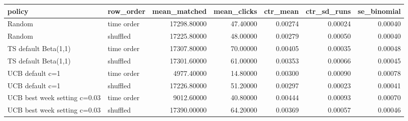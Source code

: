 \begin{tabular}{llrrrrr}
\toprule
policy & row\_order & mean\_matched & mean\_clicks & ctr\_mean & ctr\_sd\_runs & se\_binomial \\
\midrule
Random & time order & 17298.80000 & 47.40000 & 0.00274 & 0.00024 & 0.00040 \\
Random & shuffled & 17225.80000 & 48.00000 & 0.00279 & 0.00050 & 0.00040 \\
TS default Beta(1,1) & time order & 17307.80000 & 70.00000 & 0.00405 & 0.00035 & 0.00048 \\
TS default Beta(1,1) & shuffled & 17301.60000 & 61.00000 & 0.00353 & 0.00066 & 0.00045 \\
UCB default c=1 & time order & 4977.40000 & 14.80000 & 0.00300 & 0.00090 & 0.00078 \\
UCB default c=1 & shuffled & 17226.80000 & 51.20000 & 0.00297 & 0.00023 & 0.00041 \\
UCB best week setting c=0.03 & time order & 9012.60000 & 40.80000 & 0.00444 & 0.00093 & 0.00070 \\
UCB best week setting c=0.03 & shuffled & 17390.00000 & 64.20000 & 0.00369 & 0.00057 & 0.00046 \\
\bottomrule
\end{tabular}
